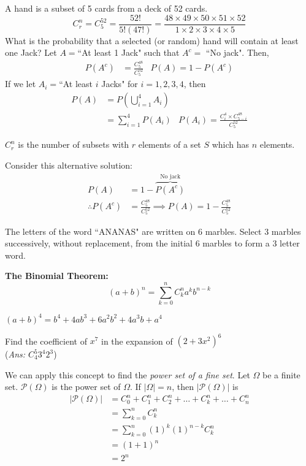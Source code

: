 \documentclass{article}
\begin{document}
	\begin{exmp}
		A hand is a subset of 5 cards from a deck of 52 cards.
		$$ C_r^n = C_5^{52} = \frac{52!}{5! (47!)} = \frac{48 \times 49 \times 50 \times 51 \times 52}{1 \times 2 \times 3 \times 4 \times 5}$$
		What is the probability that a selected (or random) hand will contain at least one Jack?
		Let $A = $``At least 1 Jack" such that  $A^c =$ ``No jack". Then,
		\begin{align*}
			P(A^c) &= \frac{C^{48}_5}{C^{52}_5} &P(A) = 1-P(A^c)
		\end{align*}
		If we let $A_i = $``At least $i$ Jacks" for $i=1,2,3,4$, then
		\begin{align*}
			P(A) &= P\left( \bigcup_{i=1}^4 A_i \right)  \\
			&= \sum_{i=1}^4 P(A_i) &P(A_i) = \frac{C_i^4 \times C_{5-i}^{48}}{C_{5}^{52}}
		\end{align*}
		\begin{rem}
			$C_r^n$ is the number of subsets with $r$ elements of a set $S$ which has $n$ elements.
		\end{rem}
		Consider this alternative solution:
		\begin{align*}
			P(A) &= 1 - \overbrace{P(A^c)}^{\text{No jack}} \\
			\therefore P(A^c) &= \frac{C_{5}^{48}}{C_5^{52}} \implies P(A) = 1- \frac{C_{5}^{48}}{C_5^{52}} 
		\end{align*}
	\end{exmp}
	\begin{exe}
		The letters of the word ``ANANAS" are written on 6 marbles. Select 3 marbles successively, without replacement, from the initial 6 marbles to form a 3 letter word.
	\end{exe}
\hfill
	\begin{thm}
		\textbf{The Binomial Theorem:}
		$$ (a+b)^n = \sum_{k=0}^n C_k^n a^{k}b^{n-k} $$
	\end{thm}
	\begin{exmp}
		$(a+b)^4 = b^4 + 4ab^3 + 6a^2b^2 + 4a^3 b + a^4$
	\end{exmp}
	\begin{exmp}
		Find the coefficient of $x^7$ in the expansion of $(2+3x^2)^6$ \\
		(\emph{Ans: $C_{4}^5 3^4 2^3$})
	\end{exmp}
\pagebreak

	We can apply this concept to find the \emph{power set of a fine set}. Let $\Omega$ be a finite set. $\mathcal{P}(\Omega)$ is the power set of $\Omega$. If $|\Omega| = n$, then $|\mathcal{P}(\Omega)|$ is
	\begin{align*}
		|\mathcal{P}(\Omega)| &= C_0^n + C_1^n + C_2^n + \dots + C_k^n + \dots + C_n^n \\
		&= \sum_{k=0}^n C_k^n \\
		&= \sum_{k=0}^n (1)^k (1)^{n-k} C_k^n \\
		&= (1+1)^n \\
		&\boxed{= 2^n}
 	\end{align*}
	
\end{document}
